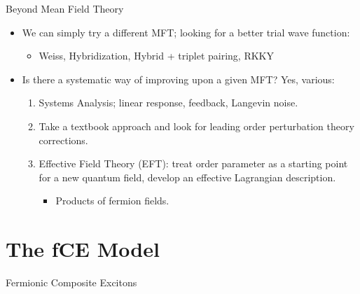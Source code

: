 \documentclass{beamer}
\begin{document}
\begin{frame}{Beyond Mean Field Theory}
    
    \begin{itemize}
        \item We can simply try a different MFT; looking for a better trial wave function:
        \begin{itemize}
            \item Weiss, Hybridization, Hybrid + triplet pairing, RKKY
        \end{itemize}
        
        \item Is there a systematic way of improving upon a given MFT? Yes, various:
        \begin{enumerate}
            
            \item Systems Analysis; linear response, feedback, Langevin noise.

            
            \item Take a textbook approach and look for leading order perturbation theory corrections.
            
            \item Effective Field Theory (EFT): treat order parameter as a starting point for a new quantum field, develop an effective Lagrangian description. 
            \begin{itemize}
                \item Products of fermion fields.
            \end{itemize}

        \end{enumerate}

    \end{itemize}
    
\end{frame}


\section{The fCE Model}


\begin{frame}
    
    \centering Fermionic Composite Excitons

\end{frame}
\end{document}
